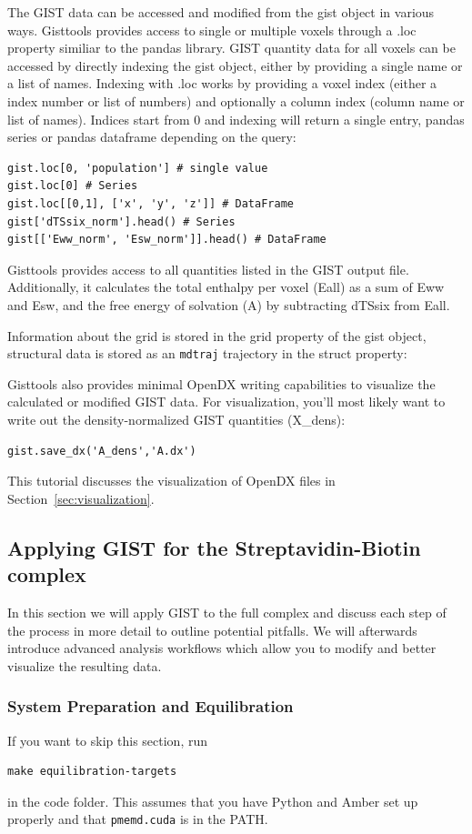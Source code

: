 \documentclass[9pt,tutorial]{livecoms}
\newcommand{\software}{\texttt}
\begin{document}
The GIST data can be accessed and modified from the gist object in various ways.
Gisttools provides access to single or multiple voxels through a .loc property similiar to the pandas library. 
GIST quantity data for all voxels can be accessed by directly indexing the gist object, either by providing a single name or a list of names.
Indexing with .loc works by providing a voxel index (either a index number or list of numbers) and optionally a column index (column name or list of names). Indices start from 0 and indexing will return a single entry, pandas series or pandas dataframe depending on the query:
\begin{lstlisting}[style=python]
gist.loc[0, 'population'] # single value
gist.loc[0] # Series
gist.loc[[0,1], ['x', 'y', 'z']] # DataFrame
gist['dTSsix_norm'].head() # Series
gist[['Eww_norm', 'Esw_norm']].head() # DataFrame
\end{lstlisting}

Gisttools provides access to all quantities listed in the GIST output file.
Additionally, it calculates the total enthalpy per voxel (Eall) as a sum of Eww and Esw, and the free energy of solvation (A) by subtracting dTSsix from Eall.

Information about the grid is stored in the grid property of the gist object, structural data is stored as an \software{mdtraj} trajectory in the struct property:

Gisttools also provides minimal OpenDX writing capabilities to visualize the calculated or modified GIST data. For visualization, you'll most likely want to write out the density-normalized GIST quantities (X\_dens):

\begin{lstlisting}[style=python]
gist.save_dx('A_dens','A.dx')
\end{lstlisting}

This tutorial discusses the visualization of OpenDX files in Section~\ref{sec:visualization}.
\subsection{Applying GIST for the Streptavidin-Biotin complex}
In this section we will apply GIST to the full complex and discuss each step of the process in more detail to outline potential pitfalls. We will afterwards introduce advanced analysis workflows which allow you to modify and better visualize the resulting data.
\subsubsection{System Preparation and Equilibration}
If you want to skip this section, run 
\begin{lstlisting}[style=bash]
make equilibration-targets
\end{lstlisting}
in the code folder. This assumes that you have Python and Amber set up properly and that \software{pmemd.cuda} is in the PATH.
\end{document}
